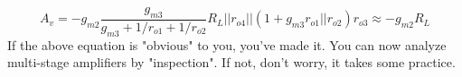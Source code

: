     \begin{equation}
        A_v = - g_{m2} \frac{g_{m3}}{g_{m3} + 1/r_{o1} + 1/r_{o2}} R_L || r_{o4} || (1 + g_{m3} r_{o1}||r_{o2}) r_{o3} \approx -g_{m2} R_L
    \end{equation} 
If the above equation is "obvious" to you, you've made it.  You can now analyze multi-stage amplifiers by "inspection".  If not, don't worry, it takes some practice.
%
%
%
%
% 
%
%
%
%
%
%
% 
%
% 
%
%
%
%
%
